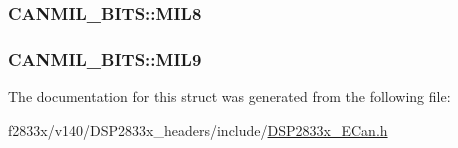 \subsubsection[{M\+I\+L8}]{ C\+A\+N\+M\+I\+L\+\_\+\+B\+I\+T\+S\+::\+M\+I\+L8}\label{struct_c_a_n_m_i_l___b_i_t_s_a68595bc692d640a4ca7a66684f9d0fa2}
\hypertarget{struct_c_a_n_m_i_l___b_i_t_s_a228b98f010049d38eca40757d6f634ca}{}
\subsubsection[{M\+I\+L9}]{ C\+A\+N\+M\+I\+L\+\_\+\+B\+I\+T\+S\+::\+M\+I\+L9}\label{struct_c_a_n_m_i_l___b_i_t_s_a228b98f010049d38eca40757d6f634ca}


The documentation for this struct was generated from the following file\+:\begin{DoxyCompactItemize}
\item 
f2833x/v140/\+D\+S\+P2833x\+\_\+headers/include/\hyperlink{_d_s_p2833x___e_can_8h}{D\+S\+P2833x\+\_\+\+E\+Can.\+h}\end{DoxyCompactItemize}
